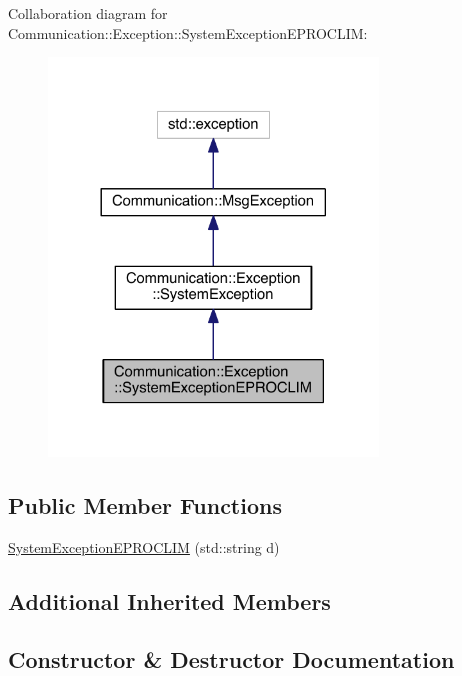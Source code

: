 Collaboration diagram for Communication\+:\+:Exception\+:\+:System\+Exception\+E\+P\+R\+O\+C\+L\+I\+M\+:\nopagebreak
\begin{figure}[H]
\begin{center}
\leavevmode
\includegraphics[width=248pt]{class_communication_1_1_exception_1_1_system_exception_e_p_r_o_c_l_i_m__coll__graph}
\end{center}
\end{figure}
\subsection*{Public Member Functions}
\begin{DoxyCompactItemize}
\item 
\hyperlink{class_communication_1_1_exception_1_1_system_exception_e_p_r_o_c_l_i_m_aee73f68a691e895d4482e298fc9e4b27}{System\+Exception\+E\+P\+R\+O\+C\+L\+I\+M} (std\+::string d)
\end{DoxyCompactItemize}
\subsection*{Additional Inherited Members}


\subsection{Constructor \& Destructor Documentation}
\hypertarget{class_communication_1_1_exception_1_1_system_exception_e_p_r_o_c_l_i_m_aee73f68a691e895d4482e298fc9e4b27}{}

